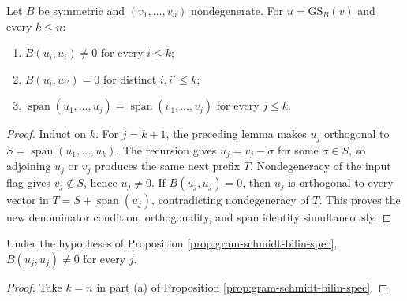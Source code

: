 \begin{proposition}
\label{prop:gram-schmidt-bilin-spec}





Let $B$ be symmetric and $(v_1,\ldots,v_n)$ nondegenerate. For
$u=\mathrm{GS}_B(v)$ and every $k\leq n$:
\begin{enumerate}[label=(\alph*)]
\item $B(u_i,u_i)\ne0$ for every $i\leq k$;
\item $B(u_i,u_{i'})=0$ for distinct $i,i'\leq k$;
\item $\operatorname{span}(u_1,\ldots,u_j)=
\operatorname{span}(v_1,\ldots,v_j)$ for every $j\leq k$.
\end{enumerate}
\end{proposition}

\begin{proof}

\sketch Induct on $k$. For $j=k+1$, the preceding lemma makes $u_j$ orthogonal
to $S=\operatorname{span}(u_1,\ldots,u_k)$. The recursion gives
$u_j=v_j-\sigma$ for some $\sigma\in S$, so adjoining $u_j$ or $v_j$ produces
the same next prefix $T$. Nondegeneracy of the input flag gives $v_j\notin S$,
hence $u_j\ne0$. If $B(u_j,u_j)=0$, then $u_j$ is orthogonal to every vector in
$T=S+\operatorname{span}(u_j)$, contradicting nondegeneracy of $T$. This proves
the new denominator condition, orthogonality, and span identity simultaneously.
\end{proof}

\begin{lemma}
\label{lem:gram-schmidt-bilin-nonvanishing}





Under the hypotheses of Proposition \ref{prop:gram-schmidt-bilin-spec},
$B(u_j,u_j)\ne0$ for every $j$.
\end{lemma}

\begin{proof}

\sketch Take $k=n$ in part (a) of Proposition
\ref{prop:gram-schmidt-bilin-spec}.
\end{proof}

